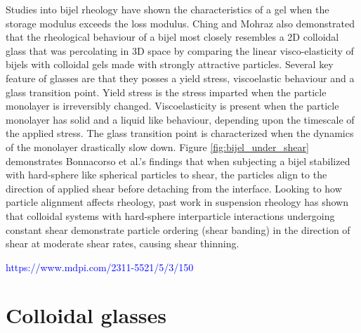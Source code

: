 Studies into bijel rheology have shown the characteristics of a gel when the
storage modulus exceeds the loss modulus. \cite{lee_making_2013, bai_dynamics_2015} Ching and Mohraz also demonstrated that the rheological behaviour of a bijel most closely resembles a 2D colloidal glass that was percolating in 3D space by comparing the linear visco-elasticity of bijels with colloidal gels made with strongly attractive particles. \cite{ching_bijel_2022} Several key feature of glasses are that they posses a yield stress, viscoelastic behaviour and a glass transition point. \cite{pham_yielding_2008, weeks_introduction_2017} Yield stress is the stress imparted when the particle monolayer is irreversibly changed. \cite{pham_yielding_2008} Viscoelasticity is present when the particle monolayer has solid and a liquid like behaviour, depending upon the timescale of the applied stress. \cite{pham_yielding_2008} The glass transition point is characterized when the dynamics of the monolayer drastically slow down. \cite{weeks_introduction_2017} Figure \ref{fig:bijel_under_shear} demonstrates Bonnacorso et al.'s findings that when subjecting a bijel stabilized with hard-sphere like spherical particles to shear, the particles align to the direction of applied shear before detaching from the interface. \cite{bonaccorso_shear_2020} Looking to how particle alignment affects rheology, past work in suspension rheology has shown that colloidal systems with hard-sphere interparticle interactions undergoing constant shear demonstrate particle ordering (shear banding) in the direction of shear at moderate shear rates, causing shear thinning. \cite{vermant_flow-induced_2005, brader_nonlinear_2010} 

\textcolor{blue}{https://www.mdpi.com/2311-5521/5/3/150}

\section{Colloidal glasses}

